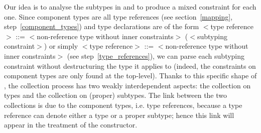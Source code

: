 


Our idea is to analyse the subtypes in \core and to produce a mixed
constraint for each one. Since component types are all type references
(see section~\ref{mapping}, step~\ref{component_types}) and type
declarations are of the form {\small $<$\textsf{type reference}$>$
\textsf{::=} $<$\textsf{non-reference type without inner
constraints}$>$ \textsf{(}$<$\textsf{subtyping
constraint}$>$\textsf{)}} or simply {\small $<$\textsf{type
reference}$>$ \textsf{::=} $<$\textsf{non-reference type without inner
constraints}$>$} (see step~\ref{type_references}), we can parse each
subtyping constraint without destructuring the type it applies to
(indeed, the constraints on component types are only found at the
top-level). Thanks to this specific shape of \core, the collection
process has two weakly interdependent aspects: the collection on types
and the collection on (proper) subtypes. The link between the two
collections is due to the component types, i.e. type references,
because a type reference can denote either a type or a proper subtype;
hence this link will appear in the treatment of the \TRef{}
constructor.



